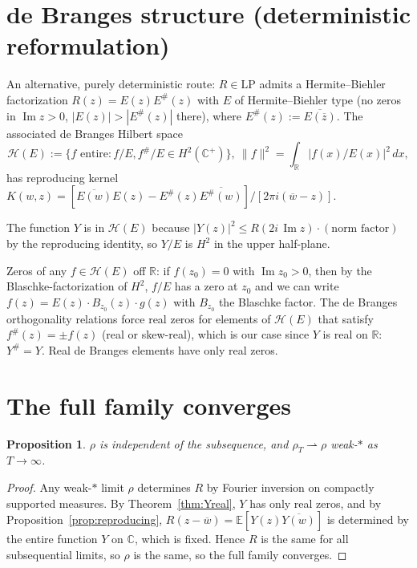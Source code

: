 \documentclass[11pt]{article}
\newtheorem{proposition}[theorem]{Proposition}
\theoremstyle{definition}
\theoremstyle{remark}
\newcommand{\R}{\mathbb{R}}
\newcommand{\C}{\mathbb{C}}
\newcommand{\E}{\mathbb{E}}
\DeclareMathOperator{\Imag}{Im}
\begin{document}
\section{de Branges structure (deterministic reformulation)}\label{sec:dbstructure}

An alternative, purely deterministic route: $R \in \mathrm{LP}$ admits a Hermite--Biehler factorization $R(z) = E(z)E^\#(z)$ with $E$ of Hermite--Biehler type (no zeros in $\Imag z > 0$, $|E(z)| > |E^\#(z)|$ there), where $E^\#(z) := \overline{E(\overline z)}$. The associated de Branges Hilbert space
\[
\mathcal H(E) := \{f \text{ entire}: f/E, f^\#/E \in H^2(\C^+)\},\ \|f\|^2 = \int_\R |f(x)/E(x)|^2\, dx,
\]
has reproducing kernel $K(w, z) = [\overline{E(w)}E(z) - E^\#(z)\overline{E^\#(w)}]/[2\pi i(\overline w - z)]$.

The function $Y$ is in $\mathcal H(E)$ because $|Y(z)|^2 \leq R(2i\,\Imag z)\cdot(\text{norm factor})$ by the reproducing identity, so $Y/E$ is $H^2$ in the upper half-plane.

Zeros of any $f \in \mathcal H(E)$ off $\R$: if $f(z_0) = 0$ with $\Imag z_0 > 0$, then by the Blaschke-factorization of $H^2$, $f/E$ has a zero at $z_0$ and we can write $f(z) = E(z) \cdot B_{z_0}(z) \cdot g(z)$ with $B_{z_0}$ the Blaschke factor. The de Branges orthogonality relations force real zeros for elements of $\mathcal H(E)$ that satisfy $f^\#(z) = \pm f(z)$ (real or skew-real), which is our case since $Y$ is real on $\R$: $Y^\# = Y$. Real de Branges elements have only real zeros.

\section{The full family converges}

\begin{proposition}\label{prop:uniquelimit}
$\rho$ is independent of the subsequence, and $\rho_T \rightharpoonup \rho$ weak-$*$ as $T \to \infty$.
\end{proposition}

\begin{proof}
Any weak-$*$ limit $\rho$ determines $R$ by Fourier inversion on compactly supported measures. By Theorem~\ref{thm:Yreal}, $Y$ has only real zeros, and by Proposition~\ref{prop:reproducing}, $R(z-\overline w) = \E[Y(z)\overline{Y(w)}]$ is determined by the entire function $Y$ on $\C$, which is fixed. Hence $R$ is the same for all subsequential limits, so $\rho$ is the same, so the full family converges.
\end{proof}
\end{document}
